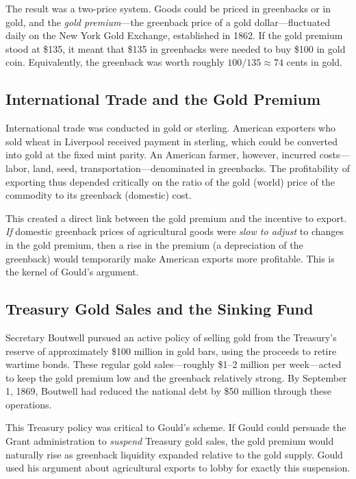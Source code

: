 \documentclass[12pt]{article}
\begin{document}
The result was a two-price system. Goods could be priced in greenbacks or 
in gold, and the \emph{gold premium}---the greenback price of a gold 
dollar---fluctuated daily on the New York Gold Exchange, established in 
1862. If the gold premium stood at \$135, it meant that \$135 in 
greenbacks were needed to buy \$100 in gold coin. Equivalently, the 
greenback was worth roughly $100/135 \approx 74$ cents in gold.

\subsection{International Trade and the Gold Premium}

International trade was conducted in gold or sterling. American exporters 
who sold wheat in Liverpool received payment in sterling, which could be 
converted into gold at the fixed mint parity. An American farmer, 
however, incurred costs---labor, land, seed, transportation---denominated 
in greenbacks. The profitability of exporting thus depended critically on 
the ratio of the gold (world) price of the commodity to its greenback 
(domestic) cost.

This created a direct link between the gold premium and the incentive to 
export. \emph{If} domestic greenback prices of agricultural goods were 
\emph{slow to adjust} to changes in the gold premium, then a rise in the 
premium (a depreciation of the greenback) would temporarily make American 
exports more profitable. This is the kernel of Gould's argument.

\subsection{Treasury Gold Sales and the Sinking Fund}

Secretary Boutwell pursued an active policy of selling gold from the 
Treasury's reserve of approximately \$100 million in gold bars, using the 
proceeds to retire wartime bonds. These regular gold sales---roughly 
\$1--2 million per week---acted to keep the gold premium low and the 
greenback relatively strong. By September 1, 1869, Boutwell had reduced 
the national debt by \$50 million through these operations.

This Treasury policy was critical to Gould's scheme. If Gould could 
persuade the Grant administration to \emph{suspend} Treasury gold sales, 
the gold premium would naturally rise as greenback liquidity expanded 
relative to the gold supply. Gould used his argument about agricultural 
exports to lobby for exactly this suspension.
\end{document}
